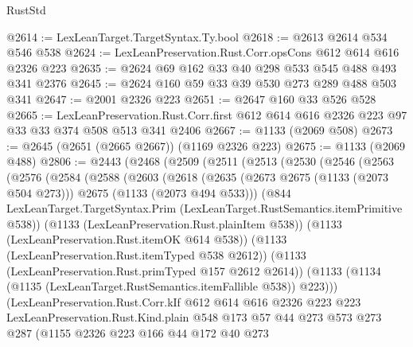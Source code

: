 \begin{lexlean}{RustStd}
\begin{coremodule}
{\begin{coremodule}
{{{{{{{{@2614 := LexLeanTarget.TargetSyntax.Ty.bool
@2618 := @2613 @2614 @534 @546 @538
@2624 := LexLeanPreservation.Rust.Corr.opsCons @612 @614 @616 @2326 @223
@2635 := @2624 @69 @162 @33 @40 @298 @533 @545 @488 @493 @341 @2376
@2645 := @2624 @160 @59 @33 @39 @530 @273 @289 @488 @503 @341
@2647 := @2001 @2326 @223
@2651 := @2647 @160 @33 @526 @528
@2665 := LexLeanPreservation.Rust.Corr.first
    @612
    @614
    @616
    @2326
    @223
    @97
    @33
    @33
    @374
    @508
    @513
    @341
    @2406
@2667 := @1133 (@2069 @508)
@2673 := @2645 (@2651 (@2665 @2667)) (@1169 @2326 @223)
@2675 := @1133 (@2069 @488)
@2806 := @2443
    (@2468
      (@2509
        (@2511
          (@2513
            (@2530
              (@2546
                (@2563
                  (@2576
                    (@2584
                      (@2588
                        (@2603
                          (@2618
                            (@2635
                              (@2673 @2675 (@1133 (@2073 @504 @273)))
                              @2675
                              (@1133 (@2073 @494 @533)))
                            (@844
                              LexLeanTarget.TargetSyntax.Prim
                              (LexLeanTarget.RustSemantics.itemPrimitive @538))
                            (@1133 (LexLeanPreservation.Rust.plainItem @538))
                            (@1133 (LexLeanPreservation.Rust.itemOK @614 @538))
                            (@1133 (LexLeanPreservation.Rust.itemTyped @538 @2612))
                            (@1133 (LexLeanPreservation.Rust.primTyped @157 @2612 @2614))
                            (@1133
                              (@1134 (@1135 (LexLeanTarget.RustSemantics.itemFallible @538)) @223)))
                          (LexLeanPreservation.Rust.Corr.kIf
                            @612
                            @614
                            @616
                            @2326
                            @223
                            @223
                            LexLeanPreservation.Rust.Kind.plain
                            @548
                            @173
                            @57
                            @44
                            @273
                            @573
                            @273
                            @287
                            (@1155
                              @2326
                              @223
                              @166
                              @44
                              @172
                              @40
                              @273
}}}}}}}}
\end{coremodule}}
\end{coremodule}
\end{lexlean}
